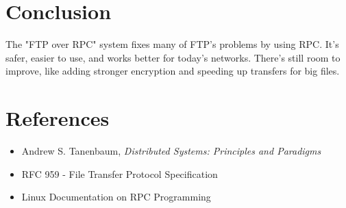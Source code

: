 \documentclass[a4paper,12pt]{article}
\begin{document}
\section{Conclusion}
The "FTP over RPC" system fixes many of FTP’s problems by using RPC. It’s safer, easier to use, and works better for today’s networks. There’s still room to improve, like adding stronger encryption and speeding up transfers for big files.

\section{References}
\begin{itemize}
    \item Andrew S. Tanenbaum, {\itshape Distributed Systems: Principles and Paradigms}
    \item RFC 959 - File Transfer Protocol Specification
    \item Linux Documentation on RPC Programming
\end{itemize}
\end{document}
